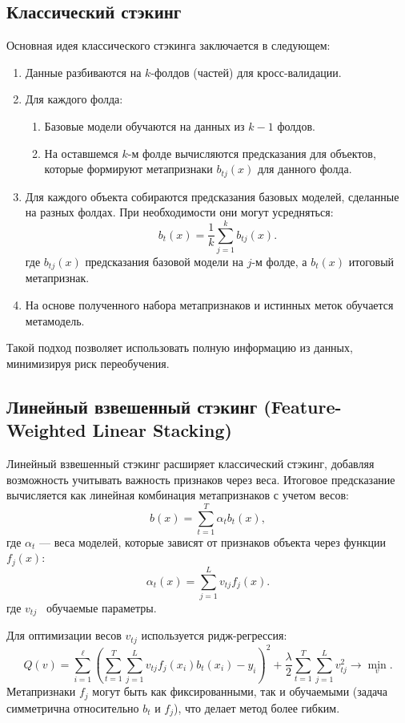 \subsection*{Классический стэкинг}


Основная идея классического стэкинга заключается в следующем:
\begin{enumerate}
    \item Данные разбиваются на \( k \)-фолдов (частей) для кросс-валидации.
    \item Для каждого фолда:
          \begin{enumerate}
              \item Базовые модели обучаются на данных из \( k-1 \) фолдов.
              \item На оставшемся \( k \)-м фолде вычисляются предсказания для объектов, которые формируют метапризнаки \( b_{tj}(x) \) для данного фолда.
          \end{enumerate}
    \item Для каждого объекта собираются предсказания базовых моделей, сделанные на разных фолдах. При необходимости они могут усредняться:
          \[
              b_t(x) = \frac{1}{k} \sum_{j=1}^k b_{tj}(x).
          \]
          где \( b_{tj}(x) \) \textemdash предсказания базовой модели на \( j \)-м фолде, а \( b_t(x) \) \textemdash итоговый метапризнак.
    \item На основе полученного набора метапризнаков и истинных меток обучается метамодель.
\end{enumerate}

Такой подход позволяет использовать полную информацию из данных, минимизируя риск переобучения.



\subsection*{Линейный взвешенный стэкинг (Feature-Weighted Linear Stacking)}

Линейный взвешенный стэкинг расширяет классический стэкинг, добавляя возможность учитывать важность признаков через веса. Итоговое предсказание вычисляется как линейная комбинация метапризнаков с учетом весов:
\[
    b(x) = \sum_{t=1}^T \alpha_t b_t(x),
\]
где \( \alpha_t \) — веса моделей, которые зависят от признаков объекта через функции \( f_j(x) \):
\[
    \alpha_t(x) = \sum_{j=1}^L v_{tj} f_j(x).
\]
где \( v_{tj} \) \textemdash~обучаемые параметры.


Для оптимизации весов \( v_{tj} \) используется ридж-регрессия:
\[
    Q(v) = \sum_{i=1}^\ell \left( \sum_{t=1}^T \sum_{j=1}^L v_{tj} f_j(x_i) b_t(x_i) - y_i \right)^2 + \frac{\lambda}{2} \sum_{t=1}^T \sum_{j=1}^L v_{tj}^2 \to \min_v.
\]
Метапризнаки \( f_j \) могут быть как фиксированными, так и обучаемыми (задача симметрична относительно \( b_t \) и \( f_j \)), что делает метод более гибким.

